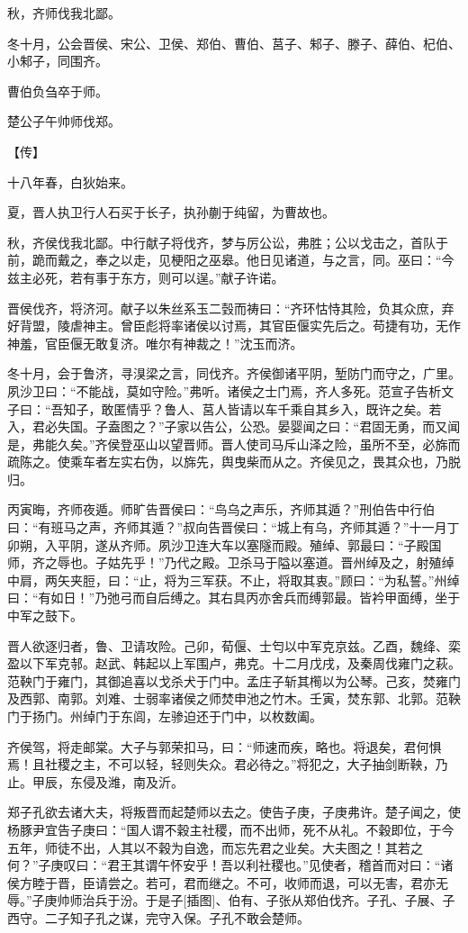 \documentclass[a4paper,12pt,UTF8,twoside]{ctexbook}
\begin{document}
秋，齐师伐我北鄙。

冬十月，公会晋侯、宋公、卫侯、郑伯、曹伯、莒子、邾子、滕子、薛伯、杞伯、小邾子，同围齐。

曹伯负刍卒于师。

楚公子午帅师伐郑。

【传】

十八年春，白狄始来。

夏，晋人执卫行人石买于长子，执孙蒯于纯留，为曹故也。

秋，齐侯伐我北鄙。中行献子将伐齐，梦与厉公讼，弗胜；公以戈击之，首队于前，跪而戴之，奉之以走，见梗阳之巫皋。他日见诸道，与之言，同。巫曰：“今兹主必死，若有事于东方，则可以逞。”献子许诺。

晋侯伐齐，将济河。献子以朱丝系玉二瑴而祷曰：“齐环怙恃其险，负其众庶，弃好背盟，陵虐神主。曾臣彪将率诸侯以讨焉，其官臣偃实先后之。苟捷有功，无作神羞，官臣偃无敢复济。唯尔有神裁之！”沈玉而济。

冬十月，会于鲁济，寻湨梁之言，同伐齐。齐侯御诸平阴，堑防门而守之，广里。夙沙卫曰：“不能战，莫如守险。”弗听。诸侯之士门焉，齐人多死。范宣子告析文子曰：“吾知子，敢匿情乎？鲁人、莒人皆请以车千乘自其乡入，既许之矣。若入，君必失国。子盍图之？”子家以告公，公恐。晏婴闻之曰：“君固无勇，而又闻是，弗能久矣。”齐侯登巫山以望晋师。晋人使司马斥山泽之险，虽所不至，必旆而疏陈之。使乘车者左实右伪，以旆先，舆曳柴而从之。齐侯见之，畏其众也，乃脱归。

丙寅晦，齐师夜遁。师旷告晋侯曰：“鸟乌之声乐，齐师其遁？”刑伯告中行伯曰：“有班马之声，齐师其遁？”叔向告晋侯曰：“城上有乌，齐师其遁？”十一月丁卯朔，入平阴，遂从齐师。夙沙卫连大车以塞隧而殿。殖绰、郭最曰：“子殿国师，齐之辱也。子姑先乎！”乃代之殿。卫杀马于隘以塞道。晋州绰及之，射殖绰中肩，两矢夹脰，曰：“止，将为三军获。不止，将取其衷。”顾曰：“为私誓。”州绰曰：“有如日！”乃弛弓而自后缚之。其右具丙亦舍兵而缚郭最。皆衿甲面缚，坐于中军之鼓下。

晋人欲逐归者，鲁、卫请攻险。己卯，荀偃、士匄以中军克京兹。乙酉，魏绛、栾盈以下军克邿。赵武、韩起以上军围卢，弗克。十二月戊戌，及秦周伐雍门之萩。范鞅门于雍门，其御追喜以戈杀犬于门中。孟庄子斩其橁以为公琴。己亥，焚雍门及西郭、南郭。刘难、士弱率诸侯之师焚申池之竹木。壬寅，焚东郭、北郭。范鞅门于扬门。州绰门于东闾，左骖迫还于门中，以枚数阖。

齐侯驾，将走邮棠。大子与郭荣扣马，曰：“师速而疾，略也。将退矣，君何惧焉！且社稷之主，不可以轻，轻则失众。君必待之。”将犯之，大子抽剑断鞅，乃止。甲辰，东侵及潍，南及沂。

郑子孔欲去诸大夫，将叛晋而起楚师以去之。使告子庚，子庚弗许。楚子闻之，使杨豚尹宜告子庚曰：“国人谓不穀主社稷，而不出师，死不从礼。不穀即位，于今五年，师徒不出，人其以不穀为自逸，而忘先君之业矣。大夫图之！其若之何？”子庚叹曰：“君王其谓午怀安乎！吾以利社稷也。”见使者，稽首而对曰：“诸侯方睦于晋，臣请尝之。若可，君而继之。不可，收师而退，可以无害，君亦无辱。”子庚帅师治兵于汾。于是子[插图]、伯有、子张从郑伯伐齐。子孔、子展、子西守。二子知子孔之谋，完守入保。子孔不敢会楚师。
\end{document}
